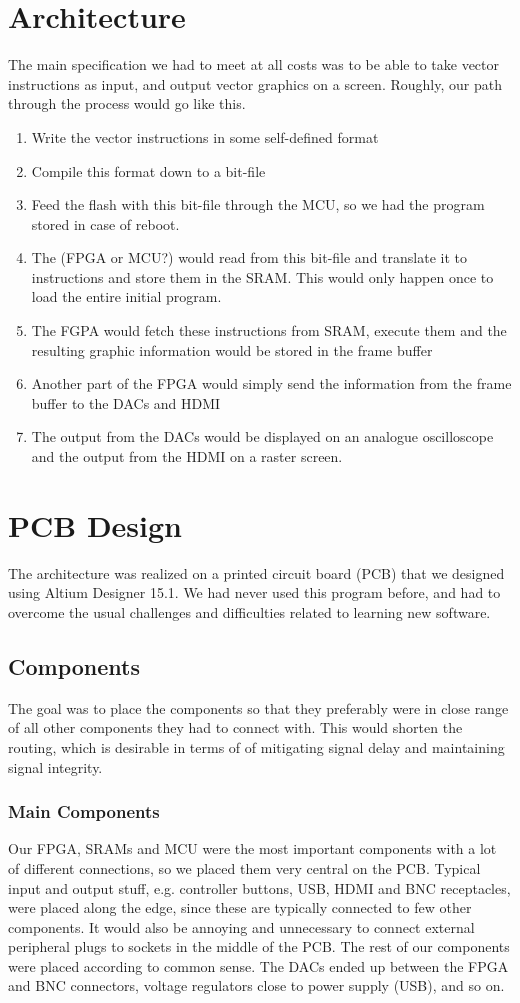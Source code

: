 \section{Architecture}
The main specification we had to meet at all costs was to be able to take vector instructions as input, and output vector graphics on a screen. Roughly, our path through the process would go like this. 
\begin{enumerate}
\item Write the vector instructions in some self-defined format
\item Compile this format down to a bit-file
\item Feed the flash with this bit-file through the MCU, so we had the program stored in case of reboot. 
\item The (FPGA or MCU?) would read from this bit-file and translate it to instructions and store them in the SRAM. This would only happen once to load the entire initial program.
\item The FGPA would fetch these instructions from SRAM, execute them and the resulting graphic information would be stored in the frame buffer
\item Another part of the FPGA would simply send the information from the frame buffer to the DACs and HDMI
\item The output from the DACs would be displayed on an analogue oscilloscope and the output from the HDMI on a raster screen.
\end{enumerate}

\section{PCB Design}
The architecture was realized on a printed circuit board (PCB) that we designed using Altium Designer 15.1. We had never used this program before, and had to overcome the usual challenges and difficulties related to learning new software.

\subsection{Components}
The goal was to place the components so that they preferably were in close range of all other components they had to connect with. This would shorten the routing, which is desirable in terms of of mitigating signal delay and maintaining signal integrity.
\subsubsection{Main Components}
Our FPGA, SRAMs and MCU were the most important components with a lot of different connections, so we placed them very central on the PCB. Typical input and output stuff, e.g. controller buttons, USB, HDMI and BNC receptacles, were placed along the edge, since these are typically connected to few other components. It would also be annoying and unnecessary to connect external peripheral plugs to sockets in the middle of the PCB. 
\newline
The rest of our components were placed according to common sense. The DACs ended up between the FPGA and BNC connectors, voltage regulators close to power supply (USB), and so on. 

